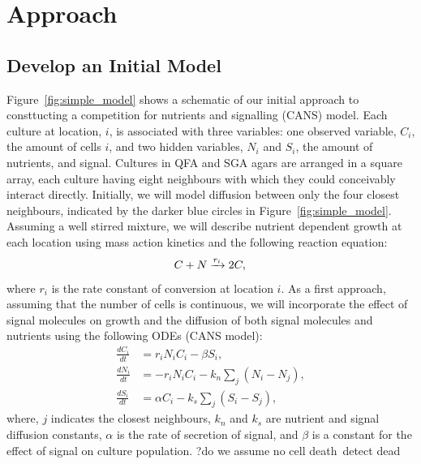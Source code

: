 \graphicspath{{images_low_res/}}
\section{Approach}
\label{sec:approach}

\subsection{Develop an Initial Model}
\label{sec:initial_model}

Figure~\ref{fig:simple_model} shows a schematic of our initial
approach to consttucting a competition for nutrients and signalling
(CANS) model. Each culture at location, \(i\), is associated with
three variables: one observed variable, \(C_{i}\), the amount of cells
\(i\), and two hidden variables, \(N_{i}\) and \(S_{i}\), the amount
of nutrients, and signal. Cultures in QFA and SGA agars are arranged
in a square array, each culture having eight neighbours with which
they could conceivably interact directly. Initially, we will
model diffusion between only the four closest neighbours, indicated by the
darker blue circles in Figure~\ref{fig:simple_model}. Assuming a well
stirred mixture, we will describe nutrient dependent growth at each
location using mass action kinetics and the following reaction
equation:
\begin{equation}
  \label{eq:2}
  C + N \xrightarrow[]{r_{i}} 2C,\\
\end{equation}
where \(r_{i}\) is the rate constant of conversion at location \(i\).
As a first approach, assuming that the number of cells is continuous,
we will incorporate the effect of signal molecules on growth and the
diffusion of both signal molecules and nutrients using the following
ODEs (CANS model):
\begin{subequations}
  \label{eq:3}
  \begin{align}
    \frac{dC_{i}}{dt}& = r_{i}N_{i}C_{i} - \beta S_{i},\\
    \frac{dN_{i}}{dt}& = - r_{i}N_{i}C_{i} - k_{n}\sum_{j}(N_{i} - N_{j}),\\
    \frac{dS_{i}}{dt}& = \alpha C_{i} - k_{s}\sum_{j}(S_{i} - S_{j}),
  \end{align}
\end{subequations}
where, \(j\) indicates the closest neighbours, \(k_{n}\) and \(k_{s}\)
are nutrient and signal diffusion constants, \(\alpha\) is the rate of
secretion of signal, and \(\beta\) is a constant for the effect of
signal on culture population. ?do we assume no cell death\ detect dead
